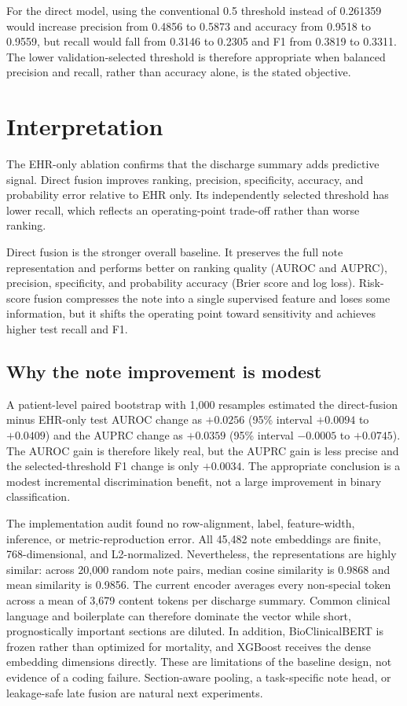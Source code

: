 \documentclass[11pt]{article}
\begin{document}
For the direct model, using the conventional 0.5 threshold instead of 0.261359
would increase precision from 0.4856 to 0.5873 and accuracy from 0.9518 to 0.9559,
but recall would fall from 0.3146 to 0.2305 and F1 from 0.3819 to 0.3311. The lower
validation-selected threshold is therefore appropriate when balanced precision
and recall, rather than accuracy alone, is the stated objective.

\section{Interpretation}

The EHR-only ablation confirms that the discharge summary adds predictive signal.
Direct fusion improves ranking, precision, specificity, accuracy, and probability
error relative to EHR only. Its independently selected threshold has lower recall,
which reflects an operating-point trade-off rather than worse ranking.

Direct fusion is the stronger overall baseline. It preserves the full note
representation and performs better on ranking quality (AUROC and AUPRC),
precision, specificity, and probability accuracy (Brier score and log loss).
Risk-score fusion compresses the note into a single supervised feature and loses
some information, but it shifts the operating point toward sensitivity and
achieves higher test recall and F1.

\subsection{Why the note improvement is modest}

A patient-level paired bootstrap with 1,000 resamples estimated the direct-fusion
minus EHR-only test AUROC change as $+0.0256$ (95\% interval $+0.0094$ to
$+0.0409$) and the AUPRC change as $+0.0359$ (95\% interval $-0.0005$ to
$+0.0745$). The AUROC gain is therefore likely real, but the AUPRC gain is less
precise and the selected-threshold F1 change is only $+0.0034$. The appropriate
conclusion is a modest incremental discrimination benefit, not a large
improvement in binary classification.

The implementation audit found no row-alignment, label, feature-width, inference,
or metric-reproduction error. All 45,482 note embeddings are finite,
768-dimensional, and L2-normalized. Nevertheless, the representations are highly
similar: across 20,000 random note pairs, median cosine similarity is 0.9868 and
mean similarity is 0.9856. The current encoder averages every non-special token
across a mean of 3,679 content tokens per discharge summary. Common clinical
language and boilerplate can therefore dominate the vector while short,
prognostically important sections are diluted. In addition, BioClinicalBERT is
frozen rather than optimized for mortality, and XGBoost receives the dense
embedding dimensions directly. These are limitations of the baseline design,
not evidence of a coding failure. Section-aware pooling, a task-specific note
head, or leakage-safe late fusion are natural next experiments.
\end{document}
